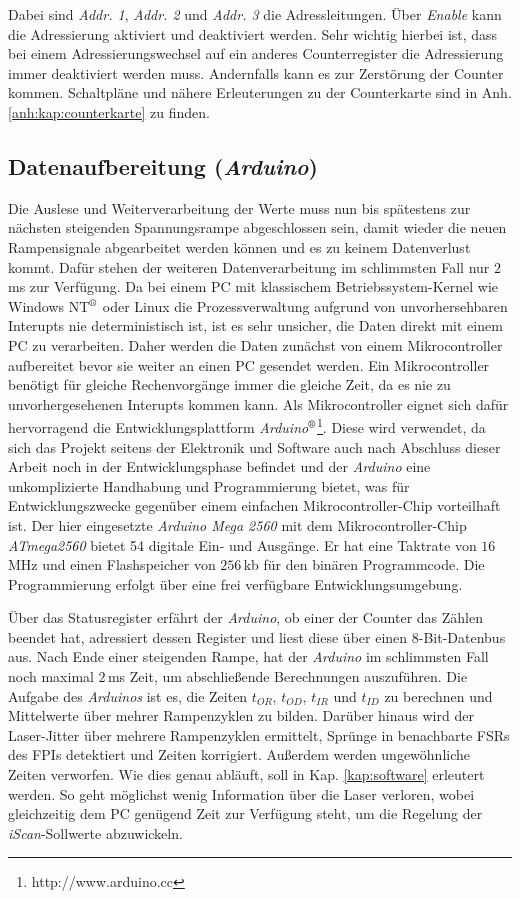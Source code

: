 Dabei sind \textit{Addr. 1}, \textit{Addr. 2} und \textit{Addr. 3} die
Adressleitungen. Über \textit{Enable} kann die Adressierung aktiviert und
deaktiviert werden. Sehr wichtig hierbei ist, dass bei einem Adressierungswechsel auf ein anderes
Counterregister die Adressierung immer deaktiviert werden muss. Andernfalls kann
es zur Zerstörung der Counter kommen. Schaltpläne und nähere Erleuterungen
zu der Counterkarte sind in Anh. \ref{anh:kap:counterkarte} zu finden.

\subsection{Datenaufbereitung (\textit{Arduino})}\label{subsec:arduino}
Die Auslese und Weiterverarbeitung der Werte muss nun bis spätestens zur
nächsten steigenden Spannungsrampe abgeschlossen sein, damit wieder die neuen
Rampensignale abgearbeitet werden können und es zu keinem Datenverlust kommt.
Dafür stehen der weiteren Datenverarbeitung im schlimmsten Fall nur $2\,$ms zur
Verfügung. Da bei einem PC mit klassischem Betriebssystem-Kernel wie Windows
NT$^\text{\textregistered}$ oder Linux die Prozessverwaltung aufgrund von
unvorhersehbaren Interupts nie deterministisch ist, ist es sehr unsicher, die Daten direkt mit einem PC zu
verarbeiten. Daher werden die Daten zunächst von einem Mikrocontroller
aufbereitet bevor sie weiter an einen PC gesendet werden. Ein Mikrocontroller
benötigt für gleiche Rechenvorgänge immer die gleiche Zeit, da es nie zu
unvorhergesehenen Interupts kommen kann. Als Mikrocontroller eignet sich dafür
hervorragend die Entwicklungsplattform \textit{Arduino$^\text{\textregistered}$}\footnote{http://www.arduino.cc}. Diese
wird verwendet, da sich das Projekt seitens der Elektronik und Software
auch nach Abschluss dieser Arbeit noch in der Entwicklungsphase befindet und der \textit{Arduino} eine unkomplizierte Handhabung
und Programmierung bietet, was für Entwicklungszwecke gegenüber einem einfachen
Mikrocontroller-Chip vorteilhaft ist. Der hier eingesetzte
\textit{Arduino Mega 2560} mit dem Mikrocontroller-Chip \textit{ATmega2560}
bietet 54 digitale Ein- und Ausgänge. Er hat eine Taktrate von $16\,$MHz und
einen Flashspeicher von $256\,$kb für den binären Programmcode.
Die Programmierung erfolgt über eine frei verfügbare Entwicklungsumgebung.\par
Über das Statusregister erfährt der \textit{Arduino}, ob einer der Counter das Zählen
beendet hat, adressiert dessen Register und liest diese über einen
8-Bit-Datenbus aus. Nach Ende einer steigenden Rampe, hat der \textit{Arduino} im
schlimmsten Fall noch maximal $2\,$ms Zeit, um abschließende Berechnungen
auszuführen. Die Aufgabe des \textit{Arduinos} ist es, die Zeiten $t_{OR}$,
$t_{OD}$, $t_{IR}$ und $t_{ID}$ zu berechnen und Mittelwerte über mehrer Rampenzyklen zu
bilden. Darüber hinaus wird der Laser-Jitter über mehrere Rampenzyklen
ermittelt, Sprünge in benachbarte FSRs des FPIs detektiert und Zeiten
korrigiert. Außerdem werden ungewöhnliche Zeiten verworfen. Wie dies genau
abläuft, soll in Kap. \ref{kap:software} erleutert werden. So geht möglichst
wenig Information über die Laser verloren, wobei gleichzeitig dem PC genügend
Zeit zur Verfügung steht, um die Regelung der \textit{iScan}-Sollwerte
abzuwickeln.


